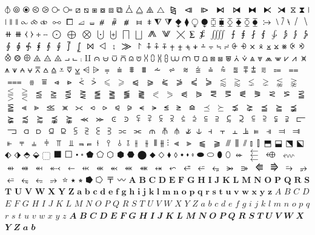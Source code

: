 $⦽$ 
$⦾$ 
$⦿$ 
$⧀$ 
$⧁$ 
$⧂$ 
$⧃$ 
$⧄$ 
$⧅$ 
$⧆$ 
$⧇$ 
$⧈$ 
$⧉$ 
$⧊$ 
$⧋$ 
$⧌$ 
$⧍$ 
$⧎$ 
$⧏$ 
$⧐$ 
$⧑$ 
$⧒$ 
$⧓$ 
$⧔$ 
$⧕$ 
$⧖$ 
$⧗$ 
$⧘$ 
$⧙$ 
$⧚$ 
$⧛$ 
$⧜$ 
$⧝$ 
$⧞$ 
$⧟$ 
$⧠$ 
$⧡$ 
$⧢$ 
$⧣$ 
$⧤$ 
$⧥$ 
$⧦$ 
$⧧$ 
$⧨$ 
$⧩$ 
$⧪$ 
$⧫$ 
$⧬$ 
$⧭$ 
$⧮$ 
$⧯$ 
$⧰$ 
$⧱$ 
$⧲$ 
$⧳$ 
$⧴$ 
$⧵$ 
$⧶$ 
$⧷$ 
$⧸$ 
$⧹$ 
$⧺$ 
$⧻$ 
$⧼$ 
$⧽$ 
$⧾$ 
$⧿$ 
$⨀$ 
$⨁$ 
$⨂$ 
$⨃$ 
$⨄$ 
$⨅$ 
$⨆$ 
$⨇$ 
$⨈$ 
$⨉$ 
$⨊$ 
$⨋$ 
$⨌$ 
$⨍$ 
$⨎$ 
$⨏$ 
$⨐$ 
$⨑$ 
$⨒$ 
$⨓$ 
$⨔$ 
$⨕$ 
$⨖$ 
$⨗$ 
$⨘$ 
$⨙$ 
$⨚$ 
$⨛$ 
$⨜$ 
$⨝$ 
$⨞$ 
$⨟$ 
$⨠$ 
$⨡$ 
$⨢$ 
$⨣$ 
$⨤$ 
$⨥$ 
$⨦$ 
$⨧$ 
$⨨$ 
$⨩$ 
$⨪$ 
$⨫$ 
$⨬$ 
$⨭$ 
$⨮$ 
$⨯$ 
$⨰$ 
$⨱$ 
$⨲$ 
$⨳$ 
$⨴$ 
$⨵$ 
$⨶$ 
$⨷$ 
$⨸$ 
$⨹$ 
$⨺$ 
$⨻$ 
$⨼$ 
$⨽$ 
$⨾$ 
$⨿$ 
$⩀$ 
$⩁$ 
$⩂$ 
$⩃$ 
$⩄$ 
$⩅$ 
$⩆$ 
$⩇$ 
$⩈$ 
$⩉$ 
$⩊$ 
$⩋$ 
$⩌$ 
$⩍$ 
$⩎$ 
$⩏$ 
$⩐$ 
$⩑$ 
$⩒$ 
$⩓$ 
$⩔$ 
$⩕$ 
$⩖$ 
$⩗$ 
$⩘$ 
$⩙$ 
$⩚$ 
$⩛$ 
$⩜$ 
$⩝$ 
$⩞$ 
$⩟$ 
$⩠$ 
$⩡$ 
$⩢$ 
$⩣$ 
$⩤$ 
$⩥$ 
$⩦$ 
$⩧$ 
$⩨$ 
$⩩$ 
$⩪$ 
$⩫$ 
$⩬$ 
$⩭$ 
$⩮$ 
$⩯$ 
$⩰$ 
$⩱$ 
$⩲$ 
$⩳$ 
$⩴$ 
$⩵$ 
$⩶$ 
$⩷$ 
$⩸$ 
$⩹$ 
$⩺$ 
$⩻$ 
$⩼$ 
$⩽$ 
$⩾$ 
$⩿$ 
$⪀$ 
$⪁$ 
$⪂$ 
$⪃$ 
$⪄$ 
$⪅$ 
$⪆$ 
$⪇$ 
$⪈$ 
$⪉$ 
$⪊$ 
$⪋$ 
$⪌$ 
$⪍$ 
$⪎$ 
$⪏$ 
$⪐$ 
$⪑$ 
$⪒$ 
$⪓$ 
$⪔$ 
$⪕$ 
$⪖$ 
$⪗$ 
$⪘$ 
$⪙$ 
$⪚$ 
$⪛$ 
$⪜$ 
$⪝$ 
$⪞$ 
$⪟$ 
$⪠$ 
$⪡$ 
$⪢$ 
$⪣$ 
$⪤$ 
$⪥$ 
$⪦$ 
$⪧$ 
$⪨$ 
$⪩$ 
$⪪$ 
$⪫$ 
$⪬$ 
$⪭$ 
$⪮$ 
$⪯$ 
$⪰$ 
$⪱$ 
$⪲$ 
$⪳$ 
$⪴$ 
$⪵$ 
$⪶$ 
$⪷$ 
$⪸$ 
$⪹$ 
$⪺$ 
$⪻$ 
$⪼$ 
$⪽$ 
$⪾$ 
$⪿$ 
$⫀$ 
$⫁$ 
$⫂$ 
$⫃$ 
$⫄$ 
$⫅$ 
$⫆$ 
$⫇$ 
$⫈$ 
$⫉$ 
$⫊$ 
$⫋$ 
$⫌$ 
$⫍$ 
$⫎$ 
$⫏$ 
$⫐$ 
$⫑$ 
$⫒$ 
$⫓$ 
$⫔$ 
$⫕$ 
$⫖$ 
$⫗$ 
$⫘$ 
$⫙$ 
$⫚$ 
$⫛$ 
$⫝̸$ 
$⫝$ 
$⫞$ 
$⫟$ 
$⫠$ 
$⫡$ 
$⫢$ 
$⫣$ 
$⫤$ 
$⫥$ 
$⫦$ 
$⫧$ 
$⫨$ 
$⫩$ 
$⫪$ 
$⫫$ 
$⫬$ 
$⫭$ 
$⫮$ 
$⫯$ 
$⫰$ 
$⫱$ 
$⫲$ 
$⫳$ 
$⫴$ 
$⫵$ 
$⫶$ 
$⫷$ 
$⫸$ 
$⫹$ 
$⫺$ 
$⫻$ 
$⫼$ 
$⫽$ 
$⫾$ 
$⫿$ 
$⬒$ 
$⬓$ 
$⬔$ 
$⬕$ 
$⬖$ 
$⬗$ 
$⬘$ 
$⬙$ 
$⬚$ 
$⬛$ 
$⬜$ 
$⬝$ 
$⬞$ 
$⬟$ 
$⬠$ 
$⬡$ 
$⬢$ 
$⬣$ 
$⬤$ 
$⬥$ 
$⬦$ 
$⬧$ 
$⬨$ 
$⬩$ 
$⬪$ 
$⬫$ 
$⬬$ 
$⬭$ 
$⬮$ 
$⬯$ 
$⬰$ 
$⬱$ 
$⬲$ 
$⬳$ 
$⬴$ 
$⬵$ 
$⬶$ 
$⬷$ 
$⬸$ 
$⬹$ 
$⬺$ 
$⬻$ 
$⬼$ 
$⬽$ 
$⬾$ 
$⬿$ 
$⭀$ 
$⭁$ 
$⭂$ 
$⭃$ 
$⭄$ 
$⭅$ 
$⭆$ 
$⭇$ 
$⭈$ 
$⭉$ 
$⭊$ 
$⭋$ 
$⭌$ 
$⭐$ 
$⭑$ 
$⭒$ 
$⭓$ 
$⭔$ 
$〒$ 
$〰$ 
$𝐀$ 
$𝐁$ 
$𝐂$ 
$𝐃$ 
$𝐄$ 
$𝐅$ 
$𝐆$ 
$𝐇$ 
$𝐈$ 
$𝐉$ 
$𝐊$ 
$𝐋$ 
$𝐌$ 
$𝐍$ 
$𝐎$ 
$𝐏$ 
$𝐐$ 
$𝐑$ 
$𝐒$ 
$𝐓$ 
$𝐔$ 
$𝐕$ 
$𝐖$ 
$𝐗$ 
$𝐘$ 
$𝐙$ 
$𝐚$ 
$𝐛$ 
$𝐜$ 
$𝐝$ 
$𝐞$ 
$𝐟$ 
$𝐠$ 
$𝐡$ 
$𝐢$ 
$𝐣$ 
$𝐤$ 
$𝐥$ 
$𝐦$ 
$𝐧$ 
$𝐨$ 
$𝐩$ 
$𝐪$ 
$𝐫$ 
$𝐬$ 
$𝐭$ 
$𝐮$ 
$𝐯$ 
$𝐰$ 
$𝐱$ 
$𝐲$ 
$𝐳$ 
$𝐴$ 
$𝐵$ 
$𝐶$ 
$𝐷$ 
$𝐸$ 
$𝐹$ 
$𝐺$ 
$𝐻$ 
$𝐼$ 
$𝐽$ 
$𝐾$ 
$𝐿$ 
$𝑀$ 
$𝑁$ 
$𝑂$ 
$𝑃$ 
$𝑄$ 
$𝑅$ 
$𝑆$ 
$𝑇$ 
$𝑈$ 
$𝑉$ 
$𝑊$ 
$𝑋$ 
$𝑌$ 
$𝑍$ 
$𝑎$ 
$𝑏$ 
$𝑐$ 
$𝑑$ 
$𝑒$ 
$𝑓$ 
$𝑔$ 
$𝑖$ 
$𝑗$ 
$𝑘$ 
$𝑙$ 
$𝑚$ 
$𝑛$ 
$𝑜$ 
$𝑝$ 
$𝑞$ 
$𝑟$ 
$𝑠$ 
$𝑡$ 
$𝑢$ 
$𝑣$ 
$𝑤$ 
$𝑥$ 
$𝑦$ 
$𝑧$ 
$𝑨$ 
$𝑩$ 
$𝑪$ 
$𝑫$ 
$𝑬$ 
$𝑭$ 
$𝑮$ 
$𝑯$ 
$𝑰$ 
$𝑱$ 
$𝑲$ 
$𝑳$ 
$𝑴$ 
$𝑵$ 
$𝑶$ 
$𝑷$ 
$𝑸$ 
$𝑹$ 
$𝑺$ 
$𝑻$ 
$𝑼$ 
$𝑽$ 
$𝑾$ 
$𝑿$ 
$𝒀$ 
$𝒁$ 
$𝒂$ 
$𝒃$ 
